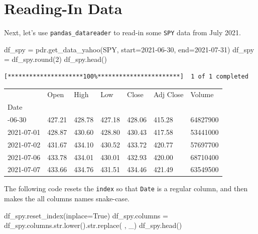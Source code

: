 \documentclass[
  letterpaper,
  DIV=11,
  numbers=noendperiod]{scrreprt}
\newenvironment{Shaded}{\begin{snugshade}}{\end{snugshade}}
\newcommand{\BuiltInTok}[1]{\textcolor[rgb]{0.00,0.23,0.31}{#1}}
\newcommand{\DecValTok}[1]{\textcolor[rgb]{0.68,0.00,0.00}{#1}}
\newcommand{\NormalTok}[1]{\textcolor[rgb]{0.00,0.23,0.31}{#1}}
\newcommand{\OperatorTok}[1]{\textcolor[rgb]{0.37,0.37,0.37}{#1}}
\newcommand{\StringTok}[1]{\textcolor[rgb]{0.13,0.47,0.30}{#1}}
\newcommand{\VariableTok}[1]{\textcolor[rgb]{0.07,0.07,0.07}{#1}}
\begin{document}
\hypertarget{reading-in-data-2}{%
\section{Reading-In Data}\label{reading-in-data-2}}

Next, let's use \texttt{pandas\_datareader} to read-in some \texttt{SPY}
data from July 2021.

\begin{Shaded}
\begin{Highlighting}[]
\NormalTok{df\_spy }\OperatorTok{=}\NormalTok{ pdr.get\_data\_yahoo(}\StringTok{\textquotesingle{}SPY\textquotesingle{}}\NormalTok{, start}\OperatorTok{=}\StringTok{\textquotesingle{}2021{-}06{-}30\textquotesingle{}}\NormalTok{, end}\OperatorTok{=}\StringTok{\textquotesingle{}2021{-}07{-}31\textquotesingle{}}\NormalTok{)}
\NormalTok{df\_spy }\OperatorTok{=}\NormalTok{ df\_spy.}\BuiltInTok{round}\NormalTok{(}\DecValTok{2}\NormalTok{)}
\NormalTok{df\_spy.head()}
\end{Highlighting}
\end{Shaded}

\begin{verbatim}
[*********************100%***********************]  1 of 1 completed
\end{verbatim}

\begin{longtable}[]{@{}lllllll@{}}
\toprule\noalign{}
& Open & High & Low & Close & Adj Close & Volume \\
Date & & & & & & \\
\midrule\noalign{}
\endhead
\bottomrule\noalign{}
\endlastfoot
2021-06-30 & 427.21 & 428.78 & 427.18 & 428.06 & 415.28 & 64827900 \\
2021-07-01 & 428.87 & 430.60 & 428.80 & 430.43 & 417.58 & 53441000 \\
2021-07-02 & 431.67 & 434.10 & 430.52 & 433.72 & 420.77 & 57697700 \\
2021-07-06 & 433.78 & 434.01 & 430.01 & 432.93 & 420.00 & 68710400 \\
2021-07-07 & 433.66 & 434.76 & 431.51 & 434.46 & 421.49 & 63549500 \\
\end{longtable}

The following code resets the \texttt{index} so that \texttt{Date} is a
regular column, and then makes the all columns names snake-case.

\begin{Shaded}
\begin{Highlighting}[]
\NormalTok{df\_spy.reset\_index(inplace}\OperatorTok{=}\VariableTok{True}\NormalTok{)}
\NormalTok{df\_spy.columns }\OperatorTok{=}\NormalTok{ df\_spy.columns.}\BuiltInTok{str}\NormalTok{.lower().}\BuiltInTok{str}\NormalTok{.replace(}\StringTok{\textquotesingle{} \textquotesingle{}}\NormalTok{, }\StringTok{\textquotesingle{}\_\textquotesingle{}}\NormalTok{)}
\NormalTok{df\_spy.head()}
\end{Highlighting}
\end{Shaded}
\end{document}
